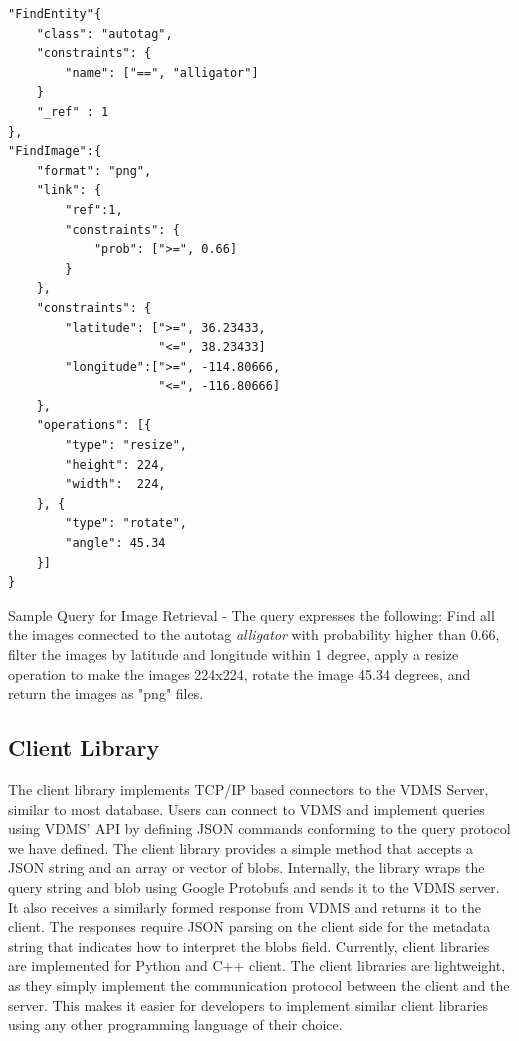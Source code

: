 \begin{listing}[ht!]
\begin{verbatim}
"FindEntity"{
    "class": "autotag",
    "constraints": {
        "name": ["==", "alligator"]
    }
    "_ref" : 1
},
"FindImage":{
    "format": "png",
    "link": {
        "ref":1,
        "constraints": {
            "prob": [">=", 0.66]
        }
    },
    "constraints": {
        "latitude": [">=", 36.23433,
                     "<=", 38.23433]
        "longitude":[">=", -114.80666,
                     "<=", -116.80666]
    },
    "operations": [{
        "type": "resize",
        "height": 224,
        "width":  224,
    }, {
        "type": "rotate",
        "angle": 45.34
    }]
}

\end{verbatim}
\caption{Sample Query for Image Retrieval -
The query expresses the following:
Find all the images connected to the autotag \textit{alligator}
with probability higher than 0.66,
filter the images by latitude and longitude within 1 degree,
apply a resize operation to make the images 224x224,
rotate the image 45.34 degrees,
and return the images as "png" files.}
\label{findimagegeo}
\end{listing}

\subsection{Client Library}

The client library implements TCP/IP based connectors to the VDMS Server,
similar to most database\cite{memsql, mysql}.
Users can connect to VDMS and implement queries using VDMS' API
by defining JSON commands conforming to the query protocol we have defined.
The client library provides a simple method that
accepts a JSON string and an array or vector of blobs.
Internally, the library wraps the query string and blob using
Google Protobufs \cite{protobufs} and sends it to the VDMS server.
It also receives a similarly formed response from VDMS
and returns it to the client.
The responses require JSON parsing on the client
side for the metadata string that indicates how to interpret the blobs field.
Currently, client libraries are implemented for Python and C++ client.
The client libraries are lightweight, as they simply implement the communication
protocol between the client and the server.
This makes it easier for developers to implement similar client libraries using
any other programming language of their choice.
